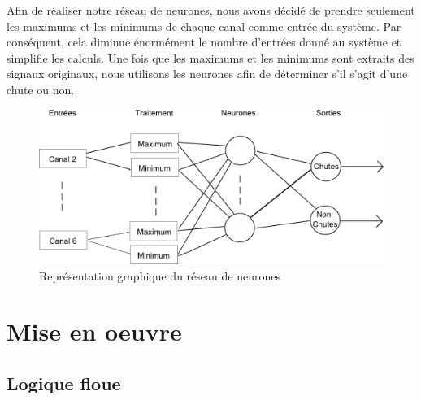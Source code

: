 \documentclass[12pt,letterpaper]{article}
\begin{document}
Afin de réaliser notre réseau de neurones, nous avons décidé de prendre seulement les maximums et les minimums de chaque canal comme entrée du système. Par conséquent, cela diminue énormément le nombre d'entrées donné au système et simplifie les calculs. Une fois que les maximums et les minimums sont extraits des signaux originaux, nous utilisons les neurones afin de déterminer s'il s'agit d'une chute ou non.

\begin{figure}
\centering
\includegraphics[scale=1]{images/NN.png}
\caption{Représentation graphique du réseau de neurones}
\label{fig:NN}
\end{figure}

\section{Mise en oeuvre}

\subsection{Logique floue}
\end{document}
